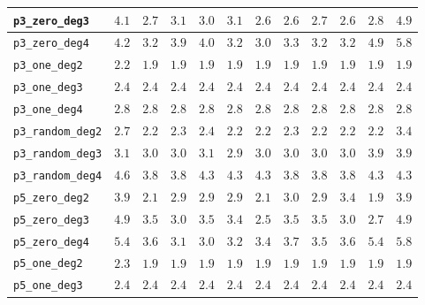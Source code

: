 \begin{landscape}
\begin{table}[H]
{\begin{tabular}{lccccccccccc}
\hline
\texttt{p3\_zero\_deg3} & $4.1$ & $2.7$ & $3.1$ & $3.0$ & $3.1$ & $2.6$ & $2.6$ & $2.7$ & \textbf{$2.6$} & $2.8$ & $4.9$ \\
\hline
\texttt{p3\_zero\_deg4} & $4.2$ & $3.2$ & $3.9$ & $4.0$ & $3.2$ & \textbf{$3.0$} & $3.3$ & $3.2$ & $3.2$ & $4.9$ & $5.8$ \\
\hline
\texttt{p3\_one\_deg2} & $2.2$ & \textbf{$1.9$} & \textbf{$1.9$} & \textbf{$1.9$} & \textbf{$1.9$} & \textbf{$1.9$} & \textbf{$1.9$} & \textbf{$1.9$} & \textbf{$1.9$} & \textbf{$1.9$} & \textbf{$1.9$} \\
\hline
\texttt{p3\_one\_deg3} & \textbf{$2.4$} & \textbf{$2.4$} & \textbf{$2.4$} & \textbf{$2.4$} & \textbf{$2.4$} & \textbf{$2.4$} & \textbf{$2.4$} & \textbf{$2.4$} & \textbf{$2.4$} & \textbf{$2.4$} & \textbf{$2.4$} \\
\hline
\texttt{p3\_one\_deg4} & \textbf{$2.8$} & \textbf{$2.8$} & \textbf{$2.8$} & \textbf{$2.8$} & \textbf{$2.8$} & \textbf{$2.8$} & \textbf{$2.8$} & \textbf{$2.8$} & \textbf{$2.8$} & \textbf{$2.8$} & \textbf{$2.8$} \\
\hline
\texttt{p3\_random\_deg2} & $2.7$ & \textbf{$2.2$} & $2.3$ & $2.4$ & \textbf{$2.2$} & $2.2$ & $2.3$ & $2.2$ & $2.2$ & $2.2$ & $3.4$ \\
\hline
\texttt{p3\_random\_deg3} & $3.1$ & $3.0$ & $3.0$ & $3.1$ & \textbf{$2.9$} & $3.0$ & $3.0$ & $3.0$ & $3.0$ & $3.9$ & $3.9$ \\
\hline
\texttt{p3\_random\_deg4} & $4.6$ & $3.8$ & \textbf{$3.8$} & $4.3$ & $4.3$ & $4.3$ & $3.8$ & $3.8$ & $3.8$ & $4.3$ & $4.3$ \\
\hline
\texttt{p5\_zero\_deg2} & $3.9$ & $2.1$ & $2.9$ & $2.9$ & $2.9$ & $2.1$ & $3.0$ & $2.9$ & $3.4$ & \textbf{$1.9$} & $3.9$ \\
\hline
\texttt{p5\_zero\_deg3} & $4.9$ & $3.5$ & $3.0$ & $3.5$ & $3.4$ & \textbf{$2.5$} & $3.5$ & $3.5$ & $3.0$ & $2.7$ & $4.9$ \\
\hline
\texttt{p5\_zero\_deg4} & $5.4$ & $3.6$ & $3.1$ & \textbf{$3.0$} & $3.2$ & $3.4$ & $3.7$ & $3.5$ & $3.6$ & $5.4$ & $5.8$ \\
\hline
\texttt{p5\_one\_deg2} & $2.3$ & \textbf{$1.9$} & \textbf{$1.9$} & \textbf{$1.9$} & \textbf{$1.9$} & \textbf{$1.9$} & \textbf{$1.9$} & \textbf{$1.9$} & \textbf{$1.9$} & \textbf{$1.9$} & \textbf{$1.9$} \\
\hline
\texttt{p5\_one\_deg3} & \textbf{$2.4$} & \textbf{$2.4$} & \textbf{$2.4$} & \textbf{$2.4$} & \textbf{$2.4$} & \textbf{$2.4$} & \textbf{$2.4$} & \textbf{$2.4$} & \textbf{$2.4$} & \textbf{$2.4$} & \textbf{$2.4$} \\

\end{tabular}}
\end{table}
\end{landscape}
